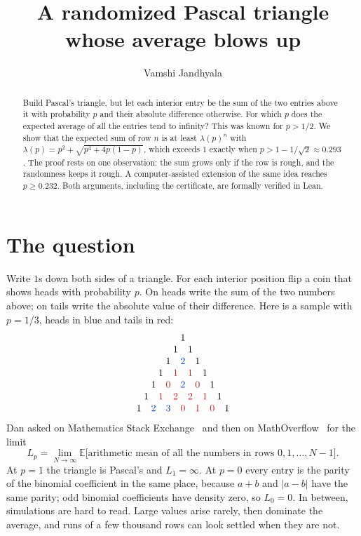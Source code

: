 \documentclass[11pt]{article}
\title{A randomized Pascal triangle whose average blows up}
\author{Vamshi Jandhyala}
\date{}
\theoremstyle{remark}
\newcommand{\E}{\mathbb{E}}
\begin{document}
\maketitle
\vspace{-2em}

\begin{abstract}
Build Pascal's triangle, but let each interior entry be the sum of the two entries above it with probability $p$ and their absolute difference otherwise. For which $p$ does the expected average of all the entries tend to infinity? This was known for $p>1/2$. We show that the expected sum of row $n$ is at least $\lambda(p)^n$ with $\lambda(p)=p^2+\sqrt{p^4+4p(1-p)}$, which exceeds $1$ exactly when $p>1-1/\sqrt2\approx0.293$. The proof rests on one observation: the sum grows only if the row is rough, and the randomness keeps it rough. A computer-assisted extension of the same idea reaches $p\ge 0.232$. Both arguments, including the certificate, are formally verified in Lean.
\end{abstract}

\section{The question}

Write $1$s down both sides of a triangle. For each interior position flip a coin that shows heads with probability $p$. On heads write the sum of the two numbers above; on tails write the absolute value of their difference. Here is a sample with $p=1/3$, heads in blue and tails in red:
\[
\begin{array}{c}
1\\
1\quad 1\\
1\quad \textcolor{heads}{2}\quad 1\\
1\quad \textcolor{tails}{1}\quad \textcolor{tails}{1}\quad 1\\
1\quad \textcolor{tails}{0}\quad \textcolor{heads}{2}\quad \textcolor{tails}{0}\quad 1\\
1\quad \textcolor{tails}{1}\quad \textcolor{tails}{2}\quad \textcolor{tails}{2}\quad \textcolor{tails}{1}\quad 1\\
1\quad \textcolor{heads}{2}\quad \textcolor{heads}{3}\quad \textcolor{tails}{0}\quad \textcolor{tails}{1}\quad \textcolor{tails}{0}\quad 1
\end{array}
\]
Dan asked on Mathematics Stack Exchange~\cite{MSE} and then on MathOverflow~\cite{MO} for the limit
\[
L_p=\lim_{N\to\infty}\E\bigl[\text{arithmetic mean of all the numbers in rows }0,1,\dots,N-1\bigr].
\]
At $p=1$ the triangle is Pascal's and $L_1=\infty$. At $p=0$ every entry is the parity of the binomial coefficient in the same place, because $a+b$ and $|a-b|$ have the same parity; odd binomial coefficients have density zero, so $L_0=0$. In between, simulations are hard to read. Large values arise rarely, then dominate the average, and runs of a few thousand rows can look settled when they are not.
\end{document}
